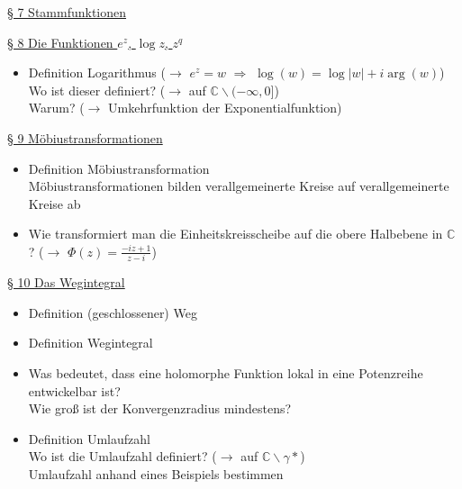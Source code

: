 \documentclass[11pt]{article}
\newcommand{\C}{\mathbb{C}}
\begin{document}
\underline{§ 7 Stammfunktionen}

\newpage
\underline{§ 8 Die Funktionen $e^z$, $\log z$, $z^q$}
\vspace{-0.5cm}
\begin{itemize}
\item Definition Logarithmus ($\rightarrow$ $e^z = w$ $\Rightarrow$ $\log(w) = \log|w| + i\arg(w)$)\\
\quad Wo ist dieser definiert? ($\rightarrow$ auf $\C \backslash (-\infty, 0]$) \\
\quad Warum? ($\rightarrow$ Umkehrfunktion der Exponentialfunktion)
\end{itemize}

\underline{§ 9 Möbiustransformationen}
\vspace{-0.5cm}
\begin{itemize}
\item Definition Möbiustransformation \\
\quad Möbiustransformationen bilden verallgemeinerte Kreise auf verallgemeinerte Kreise ab
\item Wie transformiert man die Einheitskreisscheibe auf die obere Halbebene in $\C$? ($\rightarrow$ $\Phi(z) = \frac{-iz+1}{z-i}$)
\end{itemize}

\underline{§ 10 Das Wegintegral}
\vspace{-0.5cm}
\begin{itemize}
\item Definition (geschlossener) Weg
\item Definition Wegintegral
\item Was bedeutet, dass eine holomorphe Funktion lokal in eine Potenzreihe entwickelbar ist? \\
\quad Wie groß ist der Konvergenzradius mindestens?
\item Definition Umlaufzahl \\
\quad Wo ist die Umlaufzahl definiert? ($\rightarrow$ auf $\C \backslash \gamma*$) \\
\quad Umlaufzahl anhand eines Beispiels bestimmen
\end{itemize}
\end{document}
